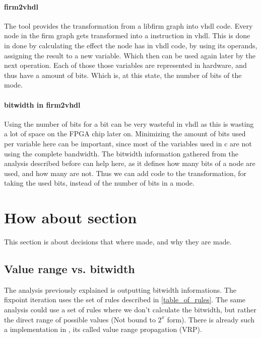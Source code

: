 \paragraph{firm2vhdl} The tool provides the transformation from a libfirm graph into vhdl code. Every node in the firm graph gets transformed into a instruction in vhdl. This is done in done by calculating the effect the node has in vhdl code, by using its operands, assigning the result to a new variable. Which then can be used again later by the next operation. 
Each of those those variables are represented in hardware, and thus have a amount of bits. Which is, at this state, the number of bits of the mode.

\paragraph{bitwidth in firm2vhdl}
Using the number of bits for a bit can be very wasteful in vhdl as this is wasting a lot of space on the FPGA chip later on. Minimizing the amount of bits used per variable here can be important, since most of the variables used in c are not using the complete bandwidth.\newline
The bitwidth information gathered from the analysis described before can help here, as it defines how many bits of a node are used, and how many are not. Thus we can add code to the transformation, for taking the used bits, instead of the number of bits in a mode.

\section{How about section}
This section is about decisions that where made, and why they are made.

\subsection{Value range vs. bitwidth}

The analysis previously explained is outputting bitwidth informations. The fixpoint iteration uses the set of rules described in \autoref{table_of_rules}. The same analysis could use a set of rules where we don't calculate the bitwidth, but rather the direct range of possible values (Not bound to $2^x$ form). There is already such a implementation in \libFIRM, its called value range propagation (VRP).

